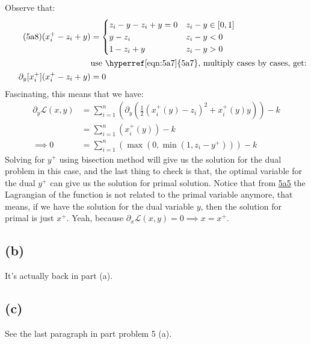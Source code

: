 \documentclass[]{article}
\begin{document}
        Observe that: 
        \begin{align*}\tag{5a8}\label{eqn:5a8}
            (x_i^+ - z_i + y) &= \begin{cases}
                z_i - y - z_i + y = 0 & z_i - y\in [0, 1]
                \\
                y - z_i & z_i - y < 0
                \\
                1 - z_i + y & z_i - y > 0
            \end{cases}
            \\
            &\text{use \hyperref[eqn:5a7]{5a7}, multiply cases by cases, get:}
            \\
            \partial_y[x_i^{+}](x_i^+ - z_i + y) 
            & =
            0
        \end{align*}
        Fascinating, this means that we have: 
        \begin{align*}\tag{5a9}\label{eqn:5a9}
            \partial_y \mathcal{L}(x, y) &= 
            \sum_{i=1}^{n}\left(
                \partial_y
                \left(
                    \frac{1}{2}(x_i^+(y) - z_i)^2 + x_i^+(y)y
                \right)
            \right)
            - k
            \\
            &= \sum_{i =1}^{n}\left(
                x_i^+(y)
            \right) - k
            \\
            \implies 
            0 &= \sum_{i = 1}^{n}\left(
                \max(0, \min(1, z_i - y^+))
            \right) - k
        \end{align*}
        Solving for $y^+$ using bisection method will give us the solution for the dual problem in this case, and the last thing to check is that, the optimal variable for the dual $y^+$ can give us the solution for primal solution. 
        Notice that from \hyperref[eqn:5a5]{5a5} the Lagrangian of the function is not related to the primal variable anymore, that means, if we have the solution for the dual variable $y$, then the solution for primal is just $x^+$. Yeah, because $\partial_x \mathcal{L}(x, y) = 0 \implies x = x^+$. 
    \subsection*{(b)}
        It's actually back in part (a). 
    \subsection*{(c)}
        See the last paragraph in part problem 5 (a). 
\end{document}
